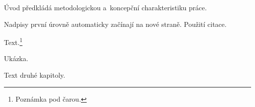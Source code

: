 \documentclass[12pt,a4paper,oneside]{report}
\begin{document}










\pagestyle{StyleBase}
\setcounter{tocdepth}{3}

\tableofcontents



\setcounter{page}{1}

\noindent
Úvod předkládá metodologickou a~koncepční charakteristiku práce.



\noindent
Nadpisy první úrovně automaticky začínají na nové straně.
Použití citace.~\cite{harry}

\noindent Text.\footnote{Poznámka pod čarou.}

\noindent Ukázka.

\noindent Text druhé kapitoly.


\end{document}
